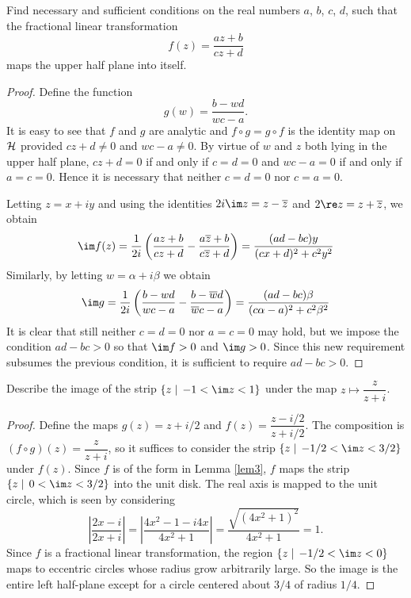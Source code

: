 \documentclass[10pt]{amsart}
\begin{document}
\begin{thm}
  \label{Ex4}
  Find necessary and sufficient conditions on the real numbers $a$, $b$, $c$, $d$, such that the fractional linear transformation 
  $$f(z) = \frac{az + b}{cz+d}$$
  maps the upper half plane into itself.
  
  \begin{proof}
    Define the function
    $$g(w) = \frac{b - w d}{w c -a}.$$
    It is easy to see that $f$ and $g$ are analytic and $f\circ g = g \circ f$ is the identity map on $\mathcal{H}$ provided $cz + d \neq 0$ and $wc - a \neq 0$.
    By virtue of $w$ and $z$ both lying in the upper half plane, $cz + d = 0$ if and only if $c = d = 0$ and $wc - a = 0$ if and only if $a = c = 0$.
    Hence it is necessary that neither $c = d = 0$ nor $c = a = 0$.
    
    Letting $z = x+iy$ and using the identities $2i\im z = z - \overline{z}$ and $2\re z = z + \overline{z}$, we obtain
    $$
    \im f(z) = \frac{1}{2i}\left(\frac{az + b}{cz + d} - \frac{a\overline{z} + b}{c\overline{z} + d}\right) = \frac{(ad-bc)y}{(cx + d)^2 + c^2y^2}
    $$
    Similarly, by letting $w = \alpha + i\beta$ we obtain
    $$
    \im g = \frac{1}{2i}\left(\frac{b - wd}{wc - a} - \frac{b - \overline{w}d}{\overline{w}c - a}\right) = \frac{(ad-bc)\beta}{(c\alpha - a)^2 + c^2\beta^2}
    $$
    It is clear that still neither $c = d = 0$ nor $a = c = 0$ may hold, but we impose the condition $ad - bc > 0$ so that $\im f > 0$ and $\im g > 0$.
    Since this new requirement subsumes the previous condition, it is sufficient to require $ad - bc > 0$.
    
  \end{proof}
\end{thm}

\begin{thm}
  \label{Ex5}
  Describe the image of the strip $\left\{z \mid\, -1 < \im z < 1\right\}$ under the map $z \longmapsto \dfrac{z}{z+i}$.
  
  \begin{proof}
    Define the maps $g(z) = z + i/2$ and $f(z) = \dfrac{z-i/2}{z + i/2}$.
    The composition is $(f\circ g)(z) = \dfrac{z}{z+i}$, so it suffices to consider the strip $\{z \mid\, -1/2 < \im z < 3/2\}$ under $f(z)$.
    Since $f$ is of the form in Lemma \ref{lem3}, $f$ maps the strip $\{z \mid\, 0<\im z < 3/2\}$ into the unit disk.
    The real axis is mapped to the unit circle, which is seen by considering 
    $$\left\vert\frac{2x - i}{2x+i}\right\vert = \left\vert \frac{4x^2 - 1 - i4x}{4x^2 + 1} \right\vert= \frac{\sqrt{(4x^2 +1)^2}}{4x^2+1} = 1.$$
    Since $f$ is a fractional linear transformation, the region $\{z \mid\, -1/2 < \im z < 0\}$ maps to eccentric circles whose radius grow arbitrarily large.
    So the image is the entire left half-plane except for a circle centered about $3/4$ of radius $1/4$.
  \end{proof}
\end{thm}
\end{document}
